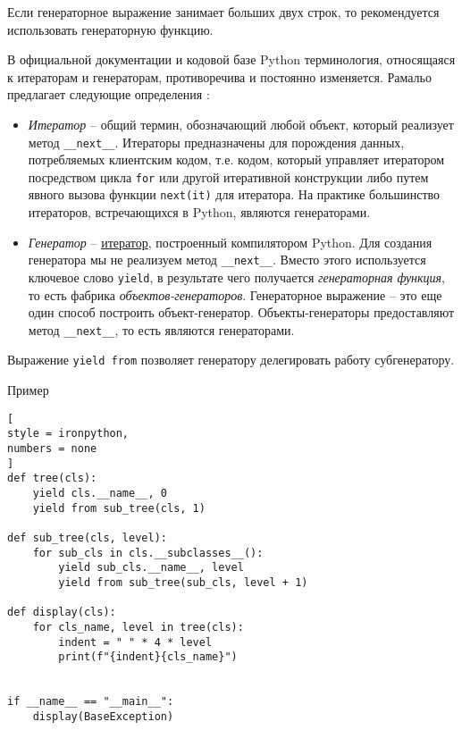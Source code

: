 \documentclass[%
	11pt,
	a4paper,
	utf8,
		]{article}
\begin{document}
Если генераторное выражение занимает больших двух строк, то рекомендуется использовать генераторную функцию.

В официальной документации и кодовой базе Python терминология, относящаяся к итераторам и генераторам, противоречива и постоянно изменяется. Рамальо предлагает следующие определения \cite[]{ramalho:python-2022}:
\begin{itemize}
	\item \emph{Итератор} -- общий термин, обозначающий любой объект, который реализует метод \verb*|__next__|. Итераторы предназначены для порождения данных, потребляемых клиентским кодом, т.е. кодом, который управляет итератором посредством цикла \verb|for| или другой итеративной конструкции либо путем явного вызова функции \verb*|next(it)| для итератора. На практике большинство итераторов, встречающихся в Python, являются генераторами. 
	
	\item \emph{Генератор} -- \underline{итератор}, построенный компилятором Python. Для создания генератора мы не реализуем метод \verb|__next__|. Вместо этого используется ключевое слово \verb*|yield|, в результате чего получается \emph{генераторная функция}, то есть фабрика \emph{объектов-генераторов}. Генераторное выражение -- это еще один способ построить объект-генератор. Объекты-генераторы предоставляют метод \verb|__next__|, то есть являются генераторами.
\end{itemize}


Выражение \verb|yield from| позволяет генератору делегировать работу субгенератору.

Пример
\begin{lstlisting}[
style = ironpython,
numbers = none
]
def tree(cls):
    yield cls.__name__, 0
    yield from sub_tree(cls, 1)
    
def sub_tree(cls, level):
    for sub_cls in cls.__subclasses__():
        yield sub_cls.__name__, level
        yield from sub_tree(sub_cls, level + 1)

def display(cls):
    for cls_name, level in tree(cls):
        indent = " " * 4 * level
        print(f"{indent}{cls_name}")
        
        
if __name__ == "__main__":
    display(BaseException)
\end{lstlisting}
\end{document}
